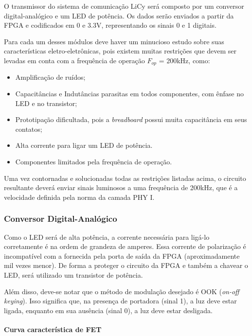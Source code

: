 	O transmissor do sistema de comunicação LiCy será composto por um conversor digital-analógico e um LED de potência. Os dados serão enviados a partir da FPGA e codificados em 0 e 3.3V, representando os sinais 0 e 1 digitais. 
	
	Para cada um desses módulos deve haver um minucioso estudo sobre suas características eletro-eletrônicas, pois existem muitas restrições que devem ser levadas em conta com a frequência de operação $F_{op}$ = 200kHz, como:
	
	\begin{itemize}  
		\item Amplificação de ruídos;
		\item Capacitâncias e Indutâncias parasitas em todos componentes, com ênfase no LED e no transistor;
		\item Prototipação dificultada, pois a \textit{breadboard} possui muita capacitância em seus contatos;
		\item Alta corrente para ligar um LED de potência.
		\item Componentes limitados pela frequência de operação.
	\end{itemize}
	
	Uma vez contornadas e solucionadas todas as restrições listadas acima, o circuito resultante deverá enviar sinais luminosos a uma frequência de 200kHz, que é a velocidade definida pela norma da camada PHY I.
	
	\subsubsection{Conversor Digital-Analógico}\label{section:dac}
	Como o LED será de alta potência, a corrente necessária para ligá-lo corretamente é na ordem de grandeza de amperes. Essa corrente de polarização é incompatível com a fornecida pela porta de saída da FPGA (aproximadamente mil vezes menor). De forma a proteger o circuito da FPGA e também a chavear o LED, será utilizado um transistor de potência.
	
	Além disso, deve-se notar que o método de modulação desejado é OOK (\textit{on-off keying}). Isso significa que, na presença de portadora (sinal 1), a luz deve estar ligada, enquanto em sua ausência (sinal 0), a luz deve estar desligada.
	
	\paragraph{Curva característica de FET}
	
